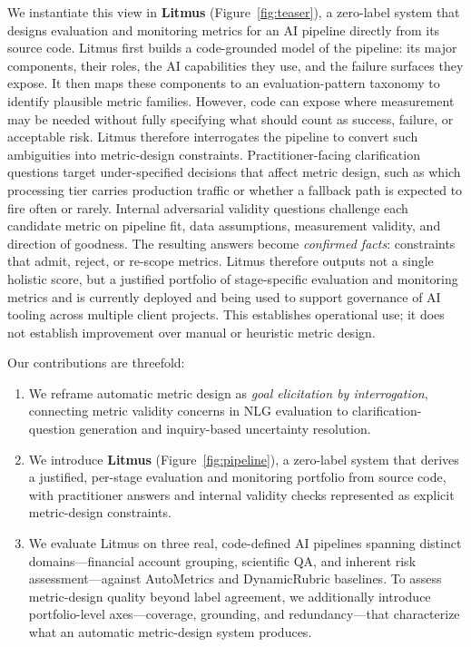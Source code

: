 \documentclass[11pt]{article}
\begin{document}
We instantiate this view in \textbf{Litmus} (Figure~\ref{fig:teaser}), a zero-label system that designs evaluation and monitoring metrics for an AI pipeline directly from its source code. Litmus first builds a code-grounded model of the pipeline: its major components, their roles, the AI capabilities they use, and the failure surfaces they expose. It then maps these components to an evaluation-pattern taxonomy to identify plausible metric families. However, code can expose where measurement may be needed without fully specifying what should count as success, failure, or acceptable risk. Litmus therefore interrogates the pipeline to convert such ambiguities into metric-design constraints. Practitioner-facing clarification questions target under-specified decisions that affect metric design, such as which processing tier carries production traffic or whether a fallback path is expected to fire often or rarely. Internal adversarial validity questions challenge each candidate metric on pipeline fit, data assumptions, measurement validity, and direction of goodness. The resulting answers become \emph{confirmed facts}: constraints that admit, reject, or re-scope metrics. Litmus therefore outputs not a single holistic score, but a justified portfolio of stage-specific evaluation and monitoring metrics and is currently deployed and being used to support governance of AI tooling across multiple client projects. This establishes operational use; it does not establish improvement over manual or heuristic metric design.


Our contributions are threefold:
\begin{enumerate}
  \item We reframe automatic metric design as \emph{goal elicitation by interrogation}, connecting metric validity concerns in NLG evaluation to clarification-question generation and inquiry-based uncertainty resolution.
  \item We introduce \textbf{Litmus} (Figure~\ref{fig:pipeline}), a zero-label system that derives a justified, per-stage evaluation and monitoring portfolio from source code, with practitioner answers and internal validity checks represented as explicit metric-design constraints.
  \item We evaluate Litmus on three real, code-defined AI pipelines spanning distinct domains---financial account grouping, scientific QA, and inherent risk assessment---against AutoMetrics and DynamicRubric baselines. To assess metric-design quality beyond label agreement, we additionally introduce portfolio-level axes---coverage, grounding, and redundancy---that characterize what an automatic metric-design system produces.
\end{enumerate}
\end{document}
